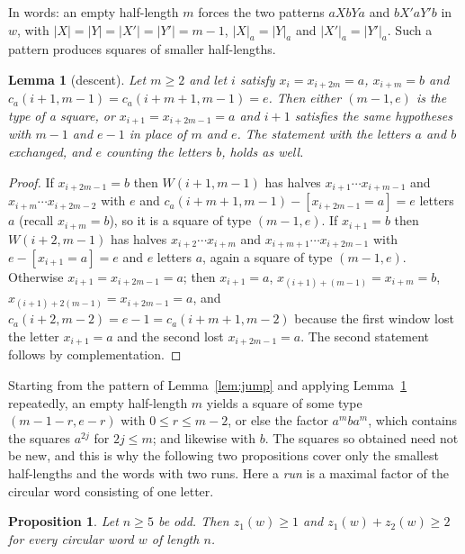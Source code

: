 \documentclass[11pt,reqno]{amsart}
\newtheorem{proposition}[theorem]{Proposition}
\newtheorem{lemma}[theorem]{Lemma}
\theoremstyle{definition}
\begin{document}
In words: an empty half-length $m$ forces the two patterns $aXbYa$ and $bX'aY'b$ in $w$, with $|X|=|Y|=|X'|=|Y'|=m-1$, $|X|_a=|Y|_a$ and $|X'|_a=|Y'|_a$. Such a pattern produces squares of smaller half-lengths.

\begin{lemma}[descent]\label{lem:descent}
Let $m\ge 2$ and let $i$ satisfy $x_i=x_{i+2m}=a$, $x_{i+m}=b$ and $c_a(i+1,m-1)=c_a(i+m+1,m-1)=e$. Then either $(m-1,e)$ is the type of a square, or $x_{i+1}=x_{i+2m-1}=a$ and $i+1$ satisfies the same hypotheses with $m-1$ and $e-1$ in place of $m$ and $e$. The statement with the letters $a$ and $b$ exchanged, and $e$ counting the letters $b$, holds as well.
\end{lemma}

\begin{proof}
If $x_{i+2m-1}=b$ then $W(i+1,m-1)$ has halves $x_{i+1}\cdots x_{i+m-1}$ and $x_{i+m}\cdots x_{i+2m-2}$ with $e$ and $c_a(i+m+1,m-1)-[x_{i+2m-1}=a]=e$ letters $a$ (recall $x_{i+m}=b$), so it is a square of type $(m-1,e)$. If $x_{i+1}=b$ then $W(i+2,m-1)$ has halves $x_{i+2}\cdots x_{i+m}$ and $x_{i+m+1}\cdots x_{i+2m-1}$ with $e-[x_{i+1}=a]=e$ and $e$ letters $a$, again a square of type $(m-1,e)$. Otherwise $x_{i+1}=x_{i+2m-1}=a$; then $x_{i+1}=a$, $x_{(i+1)+(m-1)}=x_{i+m}=b$, $x_{(i+1)+2(m-1)}=x_{i+2m-1}=a$, and $c_a(i+2,m-2)=e-1=c_a(i+m+1,m-2)$ because the first window lost the letter $x_{i+1}=a$ and the second lost $x_{i+2m-1}=a$. The second statement follows by complementation.
\end{proof}

Starting from the pattern of Lemma~\ref{lem:jump} and applying Lemma~\ref{lem:descent} repeatedly, an empty half-length $m$ yields a square of some type $(m-1-r,e-r)$ with $0\le r\le m-2$, or else the factor $a^mba^m$, which contains the squares $a^{2j}$ for $2j\le m$; and likewise with $b$. The squares so obtained need not be new, and this is why the following two propositions cover only the smallest half-lengths and the words with two runs. Here a \emph{run} is a maximal factor of the circular word consisting of one letter.

\begin{proposition}\label{prop:small}
Let $n\ge 5$ be odd. Then $z_1(w)\ge 1$ and $z_1(w)+z_2(w)\ge 2$ for every circular word $w$ of length $n$.
\end{proposition}
\end{document}
